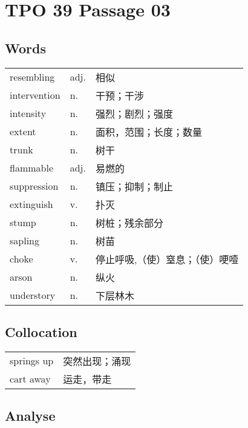\section{TPO 39 Passage 03}

\subsection{Words}

\begin{tabular}{lll}
    resembling   & adj. & 相似               \\
    intervention & n.   & 干预；干涉            \\
    intensity    & n.   & 强烈；剧烈；强度         \\
    extent       & n.   & 面积，范围；长度；数量      \\
    trunk        & n.   & 树干               \\
    flammable    & adj. & 易燃的              \\
    suppression  & n.   & 镇压；抑制；制止         \\
    extinguish   & v.   & 扑灭               \\
    stump        & n.   & 树桩；残余部分          \\
    sapling      & n.   & 树苗               \\
    choke        & v.   & 停止呼吸,（使）窒息；（使）哽噎 \\
    arson        & n.   & 纵火               \\
    understory   & n.   & 下层林木             \\
\end{tabular}

\subsection{Collocation}

\begin{tabular}{ll}
    springs up & 突然出现；涌现 \\
    cart away  & 运走，带走   \\
\end{tabular}

\subsection{Analyse}

